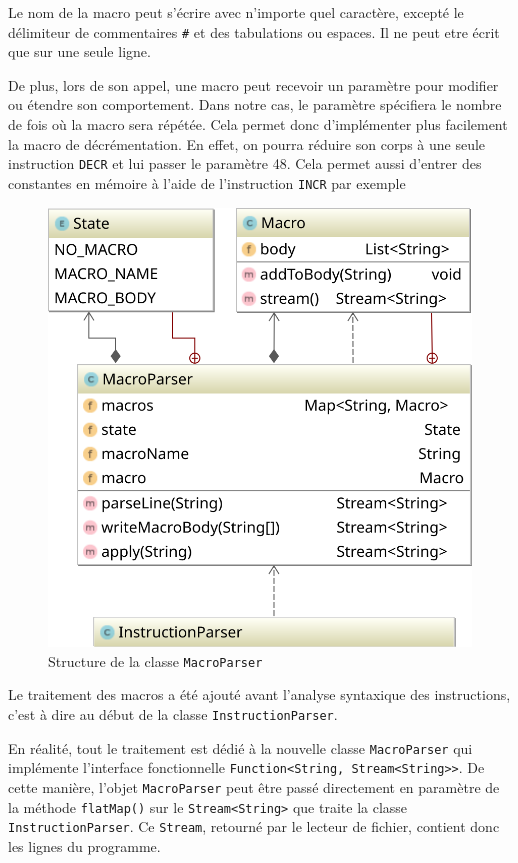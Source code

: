\documentclass[titlepage]{article}
\begin{document}
        Le nom de la macro peut s'écrire avec n'importe quel caractère, excepté le délimiteur de commentaires \texttt{\#} et des tabulations ou espaces. Il ne peut etre écrit que sur une seule ligne.
        
        De plus, lors de son appel, une macro peut recevoir un paramètre pour modifier ou étendre son comportement.
Dans notre cas, le paramètre spécifiera le nombre de fois où la macro sera répétée. Cela permet donc d'implémenter plus facilement la macro de décrémentation. En effet, on pourra réduire son corps à une seule instruction \texttt{DECR} et lui passer le paramètre 48.
Cela permet aussi d'entrer des constantes en mémoire à l'aide de l'instruction \texttt{INCR} par exemple


\begin{figure}[h]
        \centering
        \includegraphics[scale=0.6]{svgL3/macro}
        \caption{Structure de la classe \texttt{MacroParser}}
\end{figure}

        Le traitement des macros a été ajouté avant l'analyse syntaxique des instructions, c'est à dire au début de la classe \texttt{InstructionParser}.

      En réalité, tout le traitement est dédié à la nouvelle classe \texttt{MacroParser} qui implémente l'interface fonctionnelle \texttt{Function<String, Stream<String>>}. De cette manière, l'objet \texttt{MacroParser} peut être passé directement en paramètre de la méthode \texttt{flatMap()} sur le \texttt{Stream<String>} que traite la classe \texttt{InstructionParser}. Ce \texttt{Stream}, retourné par le lecteur de fichier, contient donc les lignes du programme.
\end{document}
